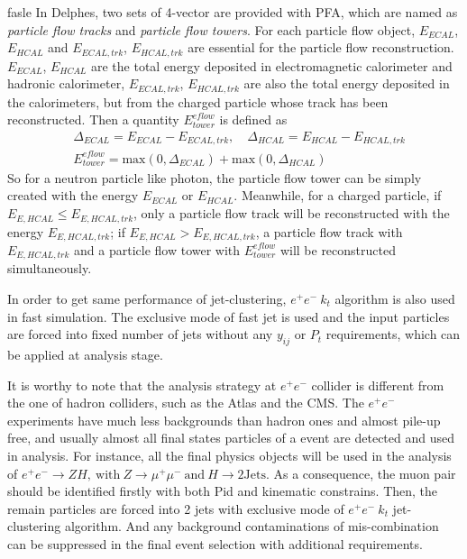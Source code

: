 \documentclass[a4paper,10pt,twoside]{cpc-hepnp}
\begin{document}
\if fasle
In Delphes, two sets of 4-vector are provided with PFA, which are named as {\it{particle flow tracks}} and {\it{particle flow towers}}.
For each particle flow object, $E_{ECAL}$, $E_{HCAL}$ and $E_{ECAL, trk}$, $E_{HCAL, trk}$ are essential for the particle flow reconstruction.
$E_{ECAL}$, $E_{HCAL}$ are the total energy deposited in electromagnetic calorimeter and hadronic calorimeter,
$E_{ECAL, trk}$, $E_{HCAL, trk}$ are also the total energy deposited in the calorimeters,
but from the charged particle whose track has been reconstructed. Then a quantity $E^{eflow}_{tower}$ is defined as
\begin{eqnarray}
&\Delta_{ECAL}=E_{ECAL}-E_{ECAL, trk}, \quad\Delta_{HCAL}=E_{HCAL}-E_{HCAL, trk}\\
&E^{eflow}_{tower}=\mathrm{max}(0,\Delta_{ECAL})+\mathrm{max}(0,\Delta_{HCAL})
\end{eqnarray}
So for a neutron particle like photon, the particle flow tower can be simply created with the energy $E_{ECAL}$ or $E_{HCAL}$. Meanwhile, for a charged particle,  if $E_{E,HCAL}\le E_{E,HCAL,trk}$, only a particle flow track will be reconstructed with the energy $E_{E,HCAL,trk}$; if $E_{E,HCAL}>E_{E,HCAL,trk}$, a particle flow track with $E_{E,HCAL,trk}$ and a particle flow tower with $E^{eflow}_{tower}$ will be reconstructed simultaneously.
\fi

In order to get same performance of jet-clustering, $e^+e^-~k_t$ algorithm is also used in fast simulation.
The exclusive mode of fast jet is used and the input particles are forced into fixed number of jets
without any $y_{ij}$ or $P_t$ requirements, which can be applied at analysis stage.

It is worthy to note that the analysis strategy at $e^+e^-$ collider is different from the one of hadron colliders,
such as the Atlas and the CMS.  The $e^+e^-$ experiments have much less backgrounds than hadron ones and almost pile-up free,
and usually almost all final states particles of a event are detected and used in analysis.
For instance, all the final physics objects will be used in the analysis of
$e^+e^- \to ZH,~\mbox{with}~Z \to\mu^+\mu^-~\mbox{and}~H \to 2\mbox{Jets} $.
As a consequence, the muon pair should be identified firstly with both Pid and kinematic constrains.
Then, the remain particles are forced into 2 jets with exclusive mode of $e^+e^-~k_t$ jet-clustering algorithm.
And any background contaminations of mis-combination can be suppressed in the final event selection with additional requirements.
\end{document}

